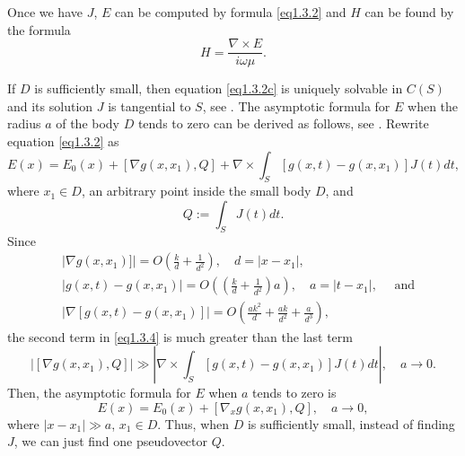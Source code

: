 \documentclass[12pt]{article}
\numberwithin{equation}{section}
\newcommand{\be}{\begin{equation}}
\newcommand{\ee}{\end{equation}}
\begin{document}
Once we have $J$, $E$ can be computed by formula \eqref{eq1.3.2} and $H$ can be found by the formula
\be \label{eq1.3.3}
    H=\frac{\nabla\times E}{i\omega \mu}.
\ee

If $D$ is sufficiently small, then equation \eqref{eq1.3.2c} is uniquely solvable in $C(S)$ and its solution $J$ is tangential to $S$, see \cite{R620}. The asymptotic formula for $E$ when the radius $a$ of the body $D$ tends to zero can be derived as follows, see \cite{R620}. Rewrite equation \eqref{eq1.3.2} as
\be \label{eq1.3.4}
    E(x)=E_0(x)+[\nabla g(x,x_1), Q]+ \nabla\times \int_{S} [g(x,t)-g(x,x_1)] J(t)dt,
\ee
where $x_1 \in D$, an arbitrary point inside the small body $D$, and
\be \label{eq1.3.5}
    Q:=\int_S J(t)dt.
\ee
Since
\begin{align}
	&|\nabla g(x,x_1)]| = O\left(\frac{k}{d}+\frac{1}{d^2}\right), \quad d=|x-x_1|,  \\
	&|g(x,t)-g(x,x_1)| = O\left(\left(\frac{k}{d}+\frac{1}{d^2}\right)a\right), \quad a=|t-x_1|, \quad \text{ and} \\
    &|\nabla[g(x,t)-g(x,x_1)]| = O\left(\frac{ak^2}{d}+\frac{ak}{d^2}+\frac{a}{d^3}\right),
\end{align}
the second term in \eqref{eq1.3.4} is much greater than the last term
\be \label{eq1.3.6}
    \left|[\nabla g(x,x_1), Q]\right| \gg \left|\nabla\times \int_{S} [g(x,t)-g(x,x_1)] J(t)dt\right|, \quad a \to 0.
\ee
Then, the asymptotic formula for $E$ when $a$ tends to zero is
\be \label{eq1.3.8}
    E(x)=E_0(x)+[\nabla_x g(x,x_1),Q], \quad a \to 0,
\ee
where $|x-x_1|\gg a$, $x_1 \in D$.
Thus, when $D$ is sufficiently small, instead of finding $J$, we can just find one pseudovector $Q$.
\end{document}
